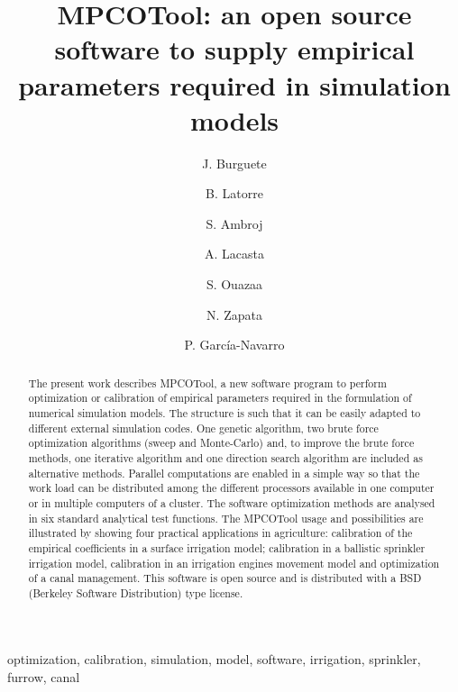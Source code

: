 \documentclass[review,authoryear]{elsarticle}
\begin{document}
\title{MPCOTool: an open source software to supply empirical parameters
required in simulation models}

\author[eead,bifi]{J. Burguete}

\author[eead]{B. Latorre}

\author[kit]{S. Ambroj}

\author[unizar]{A. Lacasta}

\author[eead]{S. Ouazaa}

\author[eead]{N. Zapata}

\author[unizar]{P. García-Navarro}


\address[eead]{Soil and Water, EEAD / CSIC.
P.O. Box 13034, 50080~Zaragoza, Spain.}
\address[bifi]{BIFI: Instituto de Biocomputación y Física de Sistemas Complejos,
Universidad de Zaragoza.
Mariano Esquillor, Edificio I+D, 50009~Zaragoza, Spain.}
\address[kit]{Steinbuch Centre for Computing (SCC),
Karlsruhe Institute of Technology (KIT).
KIT-Campus Nord, Hermann von Helmholtzplatz 1, 76344 Eggenstein - Leopoldshafen,
Germany.}
\address[unizar]{Fluid Mechanics, LIFTEC, CSIC-Universidad de Zaragoza.
María de Luna 3, 50018~Zaragoza, Spain.}

\begin{keyword}
optimization, calibration, simulation, model, software, irrigation, sprinkler,
furrow, canal
\end{keyword}

\begin{abstract}
The present work describes MPCOTool, a new software program to perform
optimization or calibration of empirical parameters required in the
formulation of numerical simulation models. The structure is such that it can be
easily adapted to different external simulation codes.
One genetic algorithm, two brute force optimization algorithms (sweep and
Monte-Carlo) and, to improve the brute force methods, one iterative algorithm
and one direction search algorithm are included as alternative methods.
Parallel computations are enabled in a simple way so that the work load can be
distributed among the different processors available in one computer or in
multiple computers of a cluster.
The software optimization methods are analysed in six standard analytical test
functions.
The MPCOTool usage and possibilities are illustrated by showing four practical
applications in agriculture: calibration of the empirical coefficients in a
surface irrigation model; calibration in a ballistic sprinkler irrigation model,
calibration in an irrigation engines movement model and optimization of a canal
management.
This software is open source and is distributed with a BSD (Berkeley Software
Distribution) type license.
\end{abstract}
\end{document}
